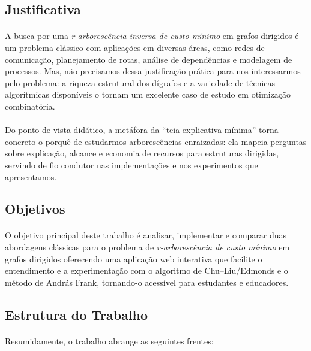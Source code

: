 \documentclass[12pt,a4paper]{article}
\begin{document}
\subsection{Justificativa}

\paragraph{}
A busca por uma \textit{r-arborescência inversa de custo mínimo} em grafos dirigidos é um problema clássico com aplicações em diversas áreas, como redes de comunicação, planejamento de rotas, análise de dependências e modelagem de processos. Mas, não precisamos dessa justificação prática para nos interessarmos pelo problema: a riqueza estrutural dos dígrafos e a variedade de técnicas algorítmicas disponíveis o tornam um excelente caso de estudo em otimização combinatória.

\paragraph{}
Do ponto de vista didático, a metáfora da “teia explicativa mínima” torna concreto o porquê de estudarmos arborescências enraizadas: ela mapeia perguntas sobre explicação, alcance e economia de recursos para estruturas dirigidas, servindo de fio condutor nas implementações e nos experimentos que apresentamos.

\subsection{Objetivos}

\paragraph{}
O objetivo principal deste trabalho é analisar, implementar e comparar duas abordagens clássicas para o problema de \textit{r-arborescência de custo mínimo} em grafos dirigidos oferecendo uma aplicação web interativa que facilite o entendimento e a experimentação com o algoritmo de Chu--Liu/Edmonds e o método de András Frank, tornando-o acessível para estudantes e educadores.

\subsection{Estrutura do Trabalho}
\paragraph{}
Resumidamente, o trabalho abrange as seguintes frentes:  
\end{document}
